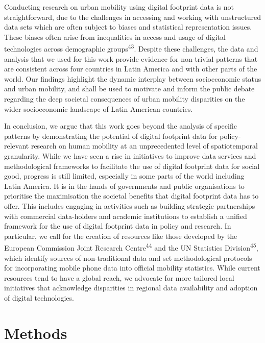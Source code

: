 \documentclass[
  11pt,
]{article}
\begin{document}
Conducting research on urban mobility using digital footprint data is
not straightforward, due to the challenges in accessing and working with
unstructured data sets which are often subject to biases and statistical
representation issues. These biases often arise from inequalities in
access and usage of digital technologies across demographic
groups\textsuperscript{43}. Despite these challenges, the data and
analysis that we used for this work provide evidence for non-trivial
patterns that are consistent across four countries in Latin America and
with other parts of the world. Our findings highlight the dynamic
interplay between socioeconomic status and urban mobility, and shall be
used to motivate and inform the public debate regarding the deep
societal consequences of urban mobility disparities on the wider
socioeconomic landscape of Latin American countries.

In conclusion, we argue that this work goes beyond the analysis of
specific patterns by demonstrating the potential of digital footprint
data for policy-relevant research on human mobility at an unprecedented
level of spatiotemporal granularity. While we have seen a rise in
initiatives to improve data services and methodological frameworks to
facilitate the use of digital footprint data for social good, progress
is still limited, especially in some parts of the world including Latin
America. It is in the hands of governments and public organisations to
prioritise the maximisation the societal benefits that digital footprint
data has to offer. This includes engaging in activities such as building
strategic partnerships with commercial data-holders and academic
institutions to establish a unified framework for the use of digital
footprint data in policy and research. In particular, we call for the
creation of resources like those developed by the European Commission
Joint Research Centre\textsuperscript{44} and the UN Statistics
Division\textsuperscript{45}, which identify sources of non-traditional
data and set methodological protocols for incorporating mobile phone
data into official mobility statistics. While current resources tend to
have a global reach, we advocate for more tailored local initiatives
that acknowledge disparities in regional data availability and adoption
of digital technologies.

\section{Methods}\label{sec-methods}
\end{document}

